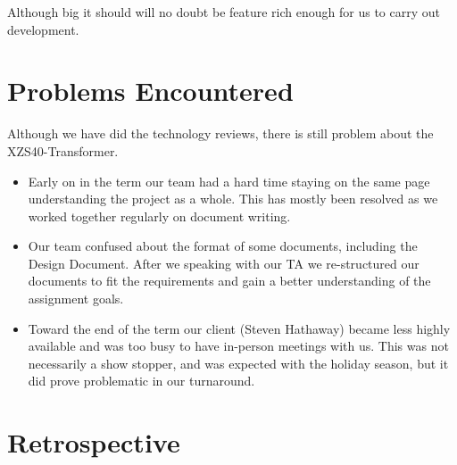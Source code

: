 Although big it should will no doubt be feature rich enough for us to carry out development.

\section{Problems Encountered}
Although we have did the technology reviews, there is still problem about the XZS40-Transformer.
\begin{itemize}

\item {
	Early on in the term our team had a hard time staying on the same page understanding the project as a whole.
    This has mostly been resolved as we worked together regularly on document writing.
}
\item {
	Our team confused about the format of some documents, including the Design Document.
  	After we speaking with our TA we re-structured our documents to fit the requirements and gain a better understanding of the assignment goals.
}
\item {
	Toward the end of the term our client (Steven Hathaway) became less highly available and was too busy to have in-person meetings with us. 
	This was not necessarily a show stopper, and was expected with the holiday season, but it did prove problematic in our turnaround.
}
      
\end{itemize}

\section{Retrospective}

